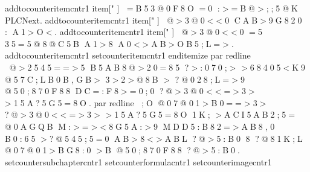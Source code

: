 { 
 	 	 \ a d d t o c o u n t e r { i t e m c n t r } { 1 } 
 
 	 	 
 
 	 	 \ i t e m [ "   ]   =B53@0F8O  =0  :>=B@>;;5@K  P L C N e x t . 	 	 
 
 	 	 \ a d d t o c o u n t e r { i t e m c n t r } { 1 } 
 
 	 	 
 
 	 	 \ i t e m [ "   ]   @>3@0<<0  CAB>9G820  :  A1>O<. 	 	 
 
 	 	 \ a d d t o c o u n t e r { i t e m c n t r } { 1 } 
 
 	 	 
 
 	 	 \ i t e m [ "   ]   @>3@0<<0  =5  35=5@8@C5B  A1>8  A0<>AB>OB5;L=>. 	 	 
 
 	 	 \ a d d t o c o u n t e r { i t e m c n t r } { 1 } 
 
 	 	 
 
 	 	 
 
 	 	 \ s e t c o u n t e r { i t e m c n t r } { 1 } 
 
 	 \ e n d { i t e m i z e }     
 
 	     
 
 	 \ p a r   \ r e d l i n e   @>2545==>5  B5AB8@>20=85  ?>:070;>  >68405<K9  @57C;LB0B,   GB>  3>2>@8B  >  ?@028;L=>9  @50;870F88  DC=:F8>=0;0  ?@>3@0<<=>3>  >15A?5G5=8O.   
 
 	 \ p a r   \ r e d l i n e   ;O  @07@01>B0==>3>  ?@>3@0<<=>3>  >15A?5G5=8O  1K;  >ACI5AB2;5=  @0AGQB  M:>=><8G5A:>9  MDD5:B82=>AB8,   0  B0:65  >?@545;5=0  AB>8<>ABL  ?@>5:B0  8  ?@81K;L  @07@01>BG8:0  >B  @50;870F88  ?@>5:B0. 
 
 	 
 
 	 
 
 
 
 	 
 
 } 
 
 
 
 \ s e t c o u n t e r { s u b c h a p t e r c n t r } { 1 } 
 
 \ s e t c o u n t e r { f o r m u l a c n t r } { 1 } 
 
 \ s e t c o u n t e r { i m a g e c n t r } { 1 } 